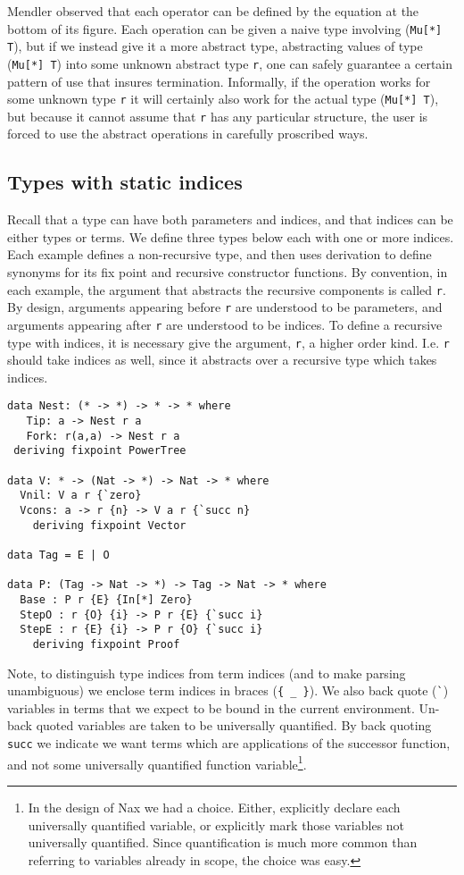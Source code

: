 Mendler observed that each operator can be defined
by the equation at the bottom of its figure. Each operation can be given
a naive type involving (\verb+Mu[*] T+), but if we instead give it a more abstract type,
abstracting values of type (\verb+Mu[*] T+) into some unknown abstract type \verb+r+, 
one can safely guarantee a certain pattern of use that insures termination.  
Informally, if the operation works for some unknown type \verb+r+
it will certainly also work for the actual type (\verb+Mu[*] T+), but because it cannot
assume that \verb+r+ has any particular structure, the user is forced to use
the abstract operations in carefully proscribed ways.
  
\subsection{Types with static indices}\label{sec:bg:ixty}
Recall that a type can have both parameters and indices, and that indices
can be either types or terms. We define three
types below each with one or more indices. Each example defines a non-recursive type, and
then uses derivation to define synonyms for its fix point and recursive constructor
functions. By convention, in each example, the argument that abstracts the recursive components
is called \verb+r+. By design, arguments appearing before \verb+r+ are understood to be
parameters, and arguments appearing after \verb+r+ are understood to be indices. To define a
recursive type with indices, it is necessary give the argument, \verb+r+,
a higher order kind. I.e. \verb+r+ should take indices as well, since it
abstracts over a recursive type which takes indices.

{\small
\begin{verbatim}
data Nest: (* -> *) -> * -> * where
   Tip: a -> Nest r a
   Fork: r(a,a) -> Nest r a
 deriving fixpoint PowerTree
  
data V: * -> (Nat -> *) -> Nat -> * where
  Vnil: V a r {`zero}
  Vcons: a -> r {n} -> V a r {`succ n}
    deriving fixpoint Vector

data Tag = E | O

data P: (Tag -> Nat -> *) -> Tag -> Nat -> * where
  Base : P r {E} {In[*] Zero} 
  StepO : r {O} {i} -> P r {E} {`succ i}
  StepE : r {E} {i} -> P r {O} {`succ i}
    deriving fixpoint Proof
\end{verbatim}}

Note, to distinguish type indices from term indices (and to make parsing unambiguous)
we enclose term indices in braces (\verb+{ _ }+). We also back quote (\verb+`+)
variables in terms that we expect to be bound in the current environment. 
Un-back quoted
variables are taken to be universally quantified. By
back quoting \verb+succ+ we indicate we
want terms which are applications of the successor function, and not some
universally quantified function variable\footnote{In the design of Nax we had a choice.
Either, explicitly declare each universally quantified variable, or explicitly mark
those variables not universally quantified. Since quantification is much more
common than referring to variables already in scope, the choice was easy.}.

